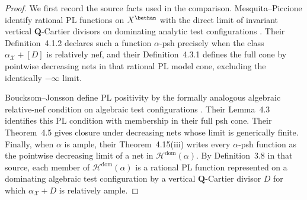 \begin{proof}
We first record the source facts used in the comparison.  Mesquita--Piccione
identify rational PL functions on \(X^{\bethan}\) with the direct limit of
invariant vertical \(\mathbf Q\)-Cartier divisors on dominating analytic
test configurations
\cite[Proposition~2.4.3 and Theorem~2.6.4]{MP24}.  Their
Definition~4.1.2 declares such a function \(\alpha\)-psh precisely when
the class \(\alpha_{\mathcal X}+[D]\) is relatively nef, and their
Definition~4.3.1 defines the full cone by pointwise decreasing nets in
that rational PL model cone, excluding the identically \(-\infty\) limit.

Boucksom--Jonsson define PL positivity by the formally analogous algebraic
relative-nef condition on algebraic test configurations
\cite[Definition~3.2]{BJ22}.  Their Lemma~4.3 identifies this PL condition
with membership in their full psh cone.  Their Theorem~4.5 gives closure
under decreasing nets whose limit is generically finite.  Finally, when
\(\alpha\) is ample, their Theorem~4.15(iii) writes every
\(\alpha\)-psh function as the pointwise decreasing limit of a net in
\(\mathcal H^{\mathrm{dom}}(\alpha)\).  By Definition~3.8 in that source,
each member of \(\mathcal H^{\mathrm{dom}}(\alpha)\) is a rational PL
function represented on a dominating algebraic test configuration by a
vertical \(\mathbf Q\)-Cartier divisor \(D\) for which
\(\alpha_{\mathcal X}+D\) is relatively ample.


\end{proof}
